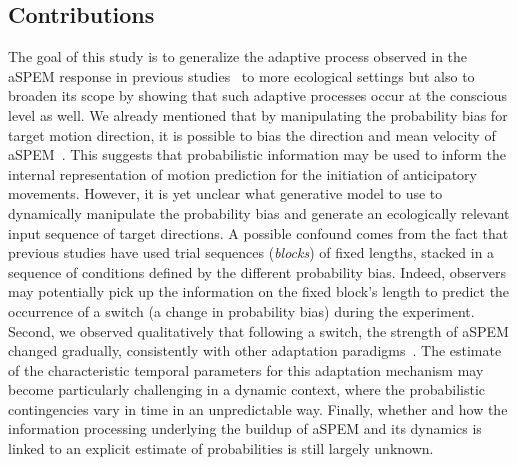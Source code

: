 \documentclass[12pt,english]{article}%
\newcommand{\citep}[1]{\parencite{#1}}
\newcommand{\seeSec}[1]{Section~\ref{sec:#1}}
\begin{document}
\subsection{Contributions}%
The goal of this study is to generalize the adaptive process
observed in the aSPEM response in previous studies~\citep{Montagnini2010,SantosKowler2017} to more ecological settings but
also to broaden its scope by showing that such adaptive processes
occur at the conscious level as well.
We already mentioned that by manipulating the probability bias for target motion direction,
it is possible to bias the direction and mean velocity of aSPEM~\citep{Montagnini2010}.
This suggests that probabilistic information may be used
to inform the internal representation of motion prediction
for the initiation of anticipatory movements.
However, it is yet unclear what generative model to use
to dynamically manipulate the probability bias
and generate an ecologically relevant input sequence of target directions.
A possible confound comes from the fact that
previous studies have used trial sequences (\textit{blocks}) of fixed lengths,
stacked in a sequence of conditions defined by the different probability bias.
Indeed, observers may potentially pick up
the information on the fixed block's length
to predict the occurrence of a switch (a change in probability bias) during the experiment.
Second, we observed qualitatively that following a switch,
the strength of aSPEM changed gradually,
consistently with other adaptation paradigms~\citep{Fukushima1996,Kahlon1996,Souto13}.
The estimate of the characteristic temporal parameters for this  adaptation mechanism
may become particularly challenging in a dynamic context,
where the probabilistic contingencies vary in time in an unpredictable way.
Finally, whether and how the information processing underlying
the buildup of aSPEM and its dynamics is linked to
an explicit estimate of probabilities is still largely unknown.
\end{document}

